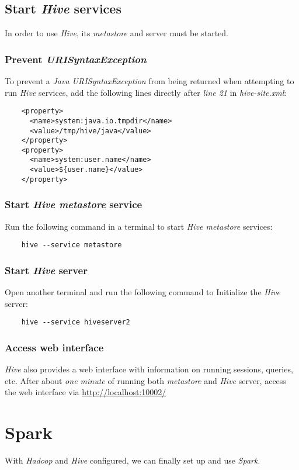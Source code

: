 \documentclass{article}
\begin{document}
  \subsection{Start \emph{Hive} services}
  \label{subsec:hiveservices}
  In order to use \emph{Hive}, its \emph{metastore} and server must be started.
    \subsubsection{Prevent \emph{URISyntaxException}}
    To prevent a \emph{Java URISyntaxException} from being returned when attempting to run
    \emph{Hive} services, add the following lines directly after \emph{line 21} in
    \emph{hive-site.xml}:
    \begin{verbatim}
    <property>
      <name>system:java.io.tmpdir</name>
      <value>/tmp/hive/java</value>
    </property>
    <property>
      <name>system:user.name</name>
      <value>${user.name}</value>
    </property>
    \end{verbatim}

    \subsubsection{Start \emph{Hive metastore} service}
    Run the following command in a terminal to start \emph{Hive metastore} services:
    \begin{verbatim}
    hive --service metastore
    \end{verbatim}

    \subsubsection{Start \emph{Hive} server}
    Open another terminal and run the following command to Initialize the \emph{Hive} server:
    \begin{verbatim}
    hive --service hiveserver2
    \end{verbatim}

    \subsubsection{Access web interface}
    \emph{Hive} also provides a web interface with information on running sessions, queries, etc.
    After about \emph{one minute} of running both \emph{metastore} and \emph{Hive} server, access
    the web interface via \url{http://localhost:10002/}

\newpage
\section{Spark}
With \emph{Hadoop} and \emph{Hive} configured, we can finally set up and use \emph{Spark}.
\end{document}
